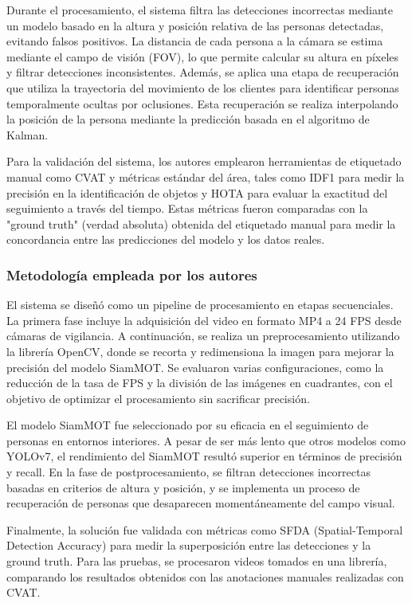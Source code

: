 Durante el procesamiento, el sistema filtra las detecciones incorrectas mediante un modelo basado en la altura y posición relativa de las personas detectadas, evitando falsos positivos. La distancia de cada persona a la cámara se estima mediante el campo de visión (FOV), lo que permite calcular su altura en píxeles y filtrar detecciones inconsistentes. Además, se aplica una etapa de recuperación que utiliza la trayectoria del movimiento de los clientes para identificar personas temporalmente ocultas por oclusiones. Esta recuperación se realiza interpolando la posición de la persona mediante la predicción basada en el algoritmo de Kalman.

Para la validación del sistema, los autores emplearon herramientas de etiquetado manual como CVAT y métricas estándar del área, tales como IDF1 para medir la precisión en la identificación de objetos y HOTA para evaluar la exactitud del seguimiento a través del tiempo. Estas métricas fueron comparadas con la "ground truth" (verdad absoluta) obtenida del etiquetado manual para medir la concordancia entre las predicciones del modelo y los datos reales.


\subsubsection{Metodología empleada por los autores}
El sistema se diseñó como un pipeline de procesamiento en etapas secuenciales. La primera fase incluye la adquisición del video en formato MP4 a 24 FPS desde cámaras de vigilancia. A continuación, se realiza un preprocesamiento utilizando la librería OpenCV, donde se recorta y redimensiona la imagen para mejorar la precisión del modelo SiamMOT. Se evaluaron varias configuraciones, como la reducción de la tasa de FPS y la división de las imágenes en cuadrantes, con el objetivo de optimizar el procesamiento sin sacrificar precisión.

El modelo SiamMOT fue seleccionado por su eficacia en el seguimiento de personas en entornos interiores. A pesar de ser más lento que otros modelos como YOLOv7, el rendimiento del SiamMOT resultó superior en términos de precisión y recall. En la fase de postprocesamiento, se filtran detecciones incorrectas basadas en criterios de altura y posición, y se implementa un proceso de recuperación de personas que desaparecen momentáneamente del campo visual.

Finalmente, la solución fue validada con métricas como SFDA (Spatial-Temporal Detection Accuracy) para medir la superposición entre las detecciones y la ground truth. Para las pruebas, se procesaron videos tomados en una librería, comparando los resultados obtenidos con las anotaciones manuales realizadas con CVAT.



